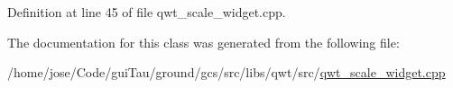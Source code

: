 Definition at line 45 of file qwt\-\_\-scale\-\_\-widget.\-cpp.



The documentation for this class was generated from the following file\-:\begin{DoxyCompactItemize}
\item 
/home/jose/\-Code/gui\-Tau/ground/gcs/src/libs/qwt/src/\hyperlink{qwt__scale__widget_8cpp}{qwt\-\_\-scale\-\_\-widget.\-cpp}\end{DoxyCompactItemize}

